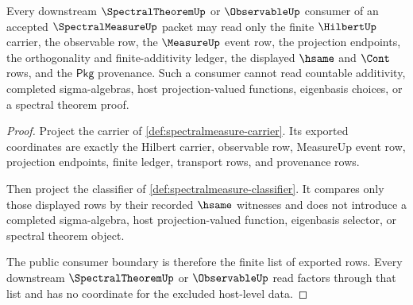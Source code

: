 \begin{theorem}
\label{thm:spectralmeasure-public-consumer-boundary}
Every downstream $\SpectralTheoremUp$ or $\ObservableUp$ consumer of an
accepted $\SpectralMeasureUp$ packet may read only the finite $\HilbertUp$
carrier, the observable row, the $\MeasureUp$ event row, the projection
endpoints, the orthogonality and finite-additivity ledger, the displayed
$\hsame$ and $\Cont$ rows, and the $\mathsf{Pkg}$ provenance. Such a consumer
cannot read countable additivity, completed sigma-algebras, host
projection-valued functions, eigenbasis choices, or a spectral theorem proof.
\end{theorem}
\begin{proof}
Project the carrier of \autoref{def:spectralmeasure-carrier}. Its exported
coordinates are exactly the Hilbert carrier, observable row, MeasureUp event
row, projection endpoints, finite ledger, transport rows, and provenance rows.

Then project the classifier of \autoref{def:spectralmeasure-classifier}. It
compares only those displayed rows by their recorded $\hsame$ witnesses and
does not introduce a completed sigma-algebra, host projection-valued function,
eigenbasis selector, or spectral theorem object.

The public consumer boundary is therefore the finite list of exported rows.
Every downstream $\SpectralTheoremUp$ or $\ObservableUp$ read factors through
that list and has no coordinate for the excluded host-level data.
\end{proof}

